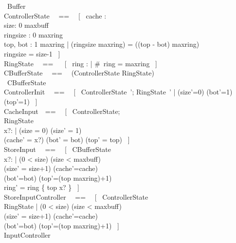 \documentclass{article}
\begin{document}
\begin{circus}
    \circprocess\ Buffer \circdef \circbegin \\
    ControllerState ~~==~~ [~ cache : \nat
        \\%
        size: 0 \upto maxbuff
        \\%
        ringsize : 0 \upto maxring
        \\%
        top, bot : 1 \upto maxring
        |
        (ringsize \mod maxring) = ((top - bot) \mod maxring)
        \\%
        ringsize = size-1
        ~] \\
    RingState ~~== ~~ [~ ring : \seq \nat | \#~ring = maxring ~] \\
    CBufferState ~~==~~ (ControllerState \lor RingState) \\
    \circstate\  CBufferState \\
    ControllerInit ~~==~~ [~ ControllerState~'; RingState~' | (size'=0) \land (bot'=1) \land (top'=1) ~] \\
    CacheInput~~==~~ [~ \Delta ControllerState;
        \\%
        \Xi RingState
        \\%
        x?:\nat
        |
        (size = 0) \land (size' = 1)
        \\%
        (cache' = x?) \land (bot' = bot) \land (top' = top) ~]\\
    StoreInput ~~==~~ [~ \Delta CBufferState
        \\%
        x?: \nat
        |
        (0 < size) \land (size < maxbuff)
        \\%
        (size' = size+1) \land (cache'=cache)
        \\%
        (bot'=bot) \land (top'=(top \mod maxring)+1)
        \\%
        ring' = ring \oplus \{ top \mapsto x? \} ~] \\
    StoreInputController ~~==~~ [~ \Delta ControllerState
        \\%
        \Xi RingState
        |
        (0 < size) \land (size < maxbuff)
        \\%
        (size' = size+1) \land (cache'=cache)
        \\%
        (bot'=bot) \land (top'=(top \mod maxring)+1) ~] \\
    InputController ~~\circdef~~ \\


\end{circus}
\end{document}
